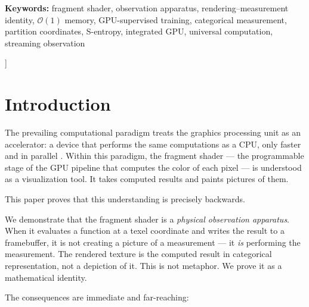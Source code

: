 \documentclass[11pt,twocolumn,a4paper]{article}
\newcommand{\BigO}{\mathcal{O}}
\begin{document}
\begin{@twocolumnfalse}
\begin{center}
\begin{minipage}{0.92\textwidth}
\vspace{8pt}
\noindent\textbf{Keywords:} fragment shader, observation apparatus,
rendering--measurement identity, $\BigO(1)$ memory, GPU-supervised
training, categorical measurement, partition coordinates, S-entropy,
integrated GPU, universal computation, streaming observation
\end{minipage}

\vspace{18pt}
\end{center}
\end{@twocolumnfalse}
]


\section{Introduction}
\label{sec:introduction}

The prevailing computational paradigm treats the graphics processing
unit as an accelerator: a device that performs the same computations as
a CPU, only faster and in parallel
\citep{owens2008,nickolls2008}. Within this paradigm, the fragment
shader --- the programmable stage of the GPU pipeline that computes
the color of each pixel --- is understood as a visualization tool.
It takes computed results and paints pictures of them.

This paper proves that this understanding is precisely backwards.

We demonstrate that the fragment shader is a \emph{physical observation
apparatus}. When it evaluates a function at a texel coordinate and
writes the result to a framebuffer, it is not creating a picture of
a measurement --- it \emph{is} performing the measurement. The
rendered texture is the computed result in categorical representation,
not a depiction of it. This is not metaphor. We prove it as a
mathematical identity.

The consequences are immediate and far-reaching:
\end{document}
